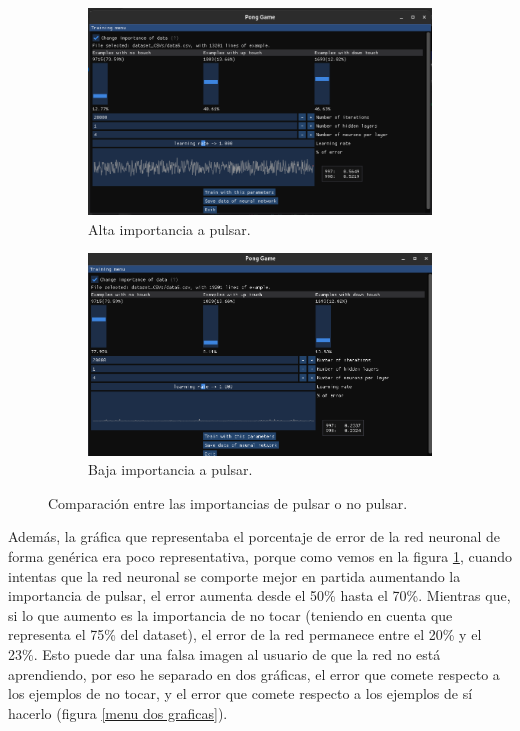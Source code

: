 \begin{figure}[h]
	\centering
	\begin{subfigure}[h]{\textwidth}
		\centering
		\includegraphics[width=15cm]{archivos/imagenes/menu-de-entrenamiento-alto-error.png}
		\caption{Alta importancia a pulsar.}
	\end{subfigure}

	\begin{subfigure}[h]{\textwidth}
		\centering
		\includegraphics[width=15cm]{archivos/imagenes/menu-de-entrenamiento-bajo-error.png}
		\caption{Baja importancia a pulsar.}
	\end{subfigure}
	\caption{Comparación entre las importancias de pulsar o no pulsar.}
	\label{Comparacion alto vs bajo error}
\end{figure}

Además, la gráfica que representaba el porcentaje de error de la red neuronal de forma genérica era poco representativa, porque como vemos en la figura \ref{Comparacion alto vs bajo error}, cuando intentas que la red neuronal se comporte mejor en partida aumentando la importancia de pulsar, el error aumenta desde el 50\% hasta el 70\%. Mientras que, si lo que aumento es la importancia de no tocar (teniendo en cuenta que representa el 75\% del dataset), el error de la red permanece entre el 20\% y el 23\%. Esto puede dar una falsa imagen al usuario de que la red no está aprendiendo, por eso he separado en dos gráficas, el error que comete respecto a los ejemplos de no tocar, y el error que comete respecto a los ejemplos de sí hacerlo (figura \ref{menu dos graficas}).

